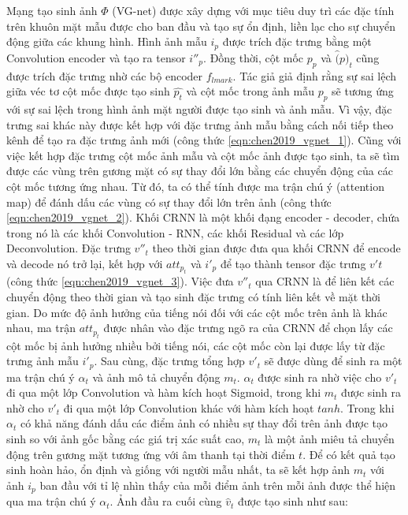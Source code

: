 Mạng tạo sinh ảnh $\Phi$ (VG-net) được xây dựng với mục tiêu duy trì các đặc tính trên khuôn mặt mẫu được cho ban đầu và tạo sự ổn định, liền lạc cho sự chuyển động giữa các khung hình. Hình ảnh mẫu $i_p$ được trích đặc trưng bằng một Convolution encoder và tạo ra tensor $i''_p$. Đồng thời, cột mốc $p_p$ và $\hat(p)_t$ cũng được trích đặc trưng nhờ các bộ encoder $f_{lmark}$. Tác giả giả định rằng sự sai lệch giữa véc tơ cột mốc được tạo sinh $\hat{p_t}$ và cột mốc trong ảnh mẫu $p_p$ sẽ tương ứng với sự sai lệch trong hình ảnh mặt người được tạo sinh và ảnh mẫu. Vì vậy, đặc trưng sai khác này được kết hợp với đặc trưng ảnh mẫu bằng cách nối tiếp theo kênh để tạo ra đặc trưng ảnh mới (công thức \ref{eqn:chen2019_vgnet_1}). Cũng với việc kết hợp đặc trưng cột mốc ảnh mẫu và cột mốc ảnh được tạo sinh, ta sẽ tìm được các vùng trên gương mặt có sự thay đổi lớn bằng các chuyển động của các cột mốc tương ứng nhau. Từ đó, ta có thể tính được ma trận chú ý (attention map) để đánh dấu các vùng có sự thay đổi lớn trên ảnh (công thức \ref{eqn:chen2019_vgnet_2}). Khối CRNN là một khối đạng encoder - decoder, chứa trong nó là các khối Convolution - RNN, các khối Residual và các lớp Deconvolution. Đặc trưng $v''_t$ theo thời gian được đưa qua khối CRNN để encode và decode nó trở lại, kết hợp với $att_{p_t}$ và $i'_p$ để tạo thành tensor đặc trưng $v't$ (công thức \ref{eqn:chen2019_vgnet_3}). Việc đưa $v''_t$ qua CRNN là để liên kết các chuyển động theo thời gian và tạo sinh đặc trưng có tính liên kết về mặt thời gian. Do mức độ ảnh hưởng của tiếng nói đối với các cột mốc trên ảnh là khác nhau, ma trận $att_{p_t}$ được nhân vào đặc trưng ngõ ra của CRNN để chọn lấy các cột mốc bị ảnh hưởng nhiều bởi tiếng nói, các cột mốc còn lại được lấy từ đặc trưng ảnh mẫu $i'_p$. Sau cùng, đặc trưng tổng hợp $v'_t$ sẽ được dùng để sinh ra một ma trận chú ý $\alpha_t$ và ảnh mô tả chuyển động $m_t$. $\alpha_t$ được sinh ra nhờ việc cho $v'_t$ đi qua một lớp Convolution và hàm kích hoạt Sigmoid, trong khi $m_t$ được sinh ra nhờ cho $v'_t$ đi qua một lớp Convolution khác với hàm kích hoạt $tanh$. Trong khi $\alpha_t$ có khả năng đánh dấu các điểm ảnh có nhiều sự thay đổi trên ảnh được tạo sinh so với ảnh gốc bằng các giá trị xác suất cao, $m_t$ là một ảnh miêu tả chuyển động trên gương mặt tương ứng với âm thanh tại thời điểm $t$. Để có kết quả tạo sinh hoàn hảo, ổn định và giống với người mẫu nhất, ta sẽ kết hợp ảnh $m_t$ với ảnh $i_p$ ban đầu với tỉ lệ nhìn thấy của mỗi điểm ảnh trên mỗi ảnh được thể hiện qua ma trận chú ý $\alpha_t$. Ảnh đầu ra cuối cùng $\hat{v}_t$ được tạo sinh như sau: 

